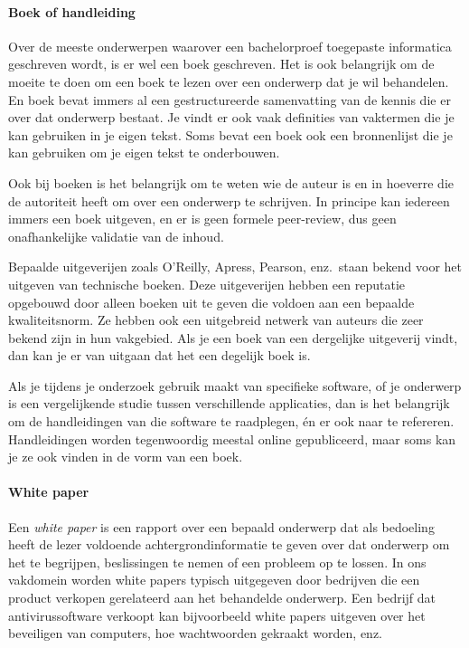 \paragraph{Boek of handleiding}

Over de meeste onderwerpen waarover een bachelorproef toegepaste informatica geschreven wordt, is er wel een boek geschreven. Het is ook belangrijk om de moeite te doen om een boek te lezen over een onderwerp dat je wil behandelen. En boek bevat immers al een gestructureerde samenvatting van de kennis die er over dat onderwerp bestaat. Je vindt er ook vaak definities van vaktermen die je kan gebruiken in je eigen tekst. Soms bevat een boek ook een bronnenlijst die je kan gebruiken om je eigen tekst te onderbouwen.

Ook bij boeken is het belangrijk om te weten wie de auteur is en in hoeverre die de autoriteit heeft om over een onderwerp te schrijven. In principe kan iedereen immers een boek uitgeven, en er is geen formele peer-review, dus geen onafhankelijke validatie van de inhoud.

Bepaalde uitgeverijen zoals O'Reilly, Apress, Pearson, enz.\ staan bekend voor het uitgeven van technische boeken. Deze uitgeverijen hebben een reputatie opgebouwd door alleen boeken uit te geven die voldoen aan een bepaalde kwaliteitsnorm. Ze hebben ook een uitgebreid netwerk van auteurs die zeer bekend zijn in hun vakgebied. Als je een boek van een dergelijke uitgeverij vindt, dan kan je er van uitgaan dat het een degelijk boek is.

Als je tijdens je onderzoek gebruik maakt van specifieke software, of je onderwerp is een vergelijkende studie tussen verschillende applicaties, dan is het belangrijk om de handleidingen van die software te raadplegen, én er ook naar te refereren. Handleidingen worden tegenwoordig meestal online gepubliceerd, maar soms kan je ze ook vinden in de vorm van een boek.

\paragraph{White paper}

Een \emph{white paper} is een rapport over een bepaald onderwerp dat als bedoeling heeft de lezer voldoende achtergrondinformatie te geven over dat onderwerp om het te begrijpen, beslissingen te nemen of een probleem op te lossen. In ons vakdomein worden white papers typisch uitgegeven door bedrijven die een product verkopen gerelateerd aan het behandelde onderwerp. Een bedrijf dat antivirussoftware verkoopt kan bijvoorbeeld white papers uitgeven over het beveiligen van computers, hoe wachtwoorden gekraakt worden, enz.


